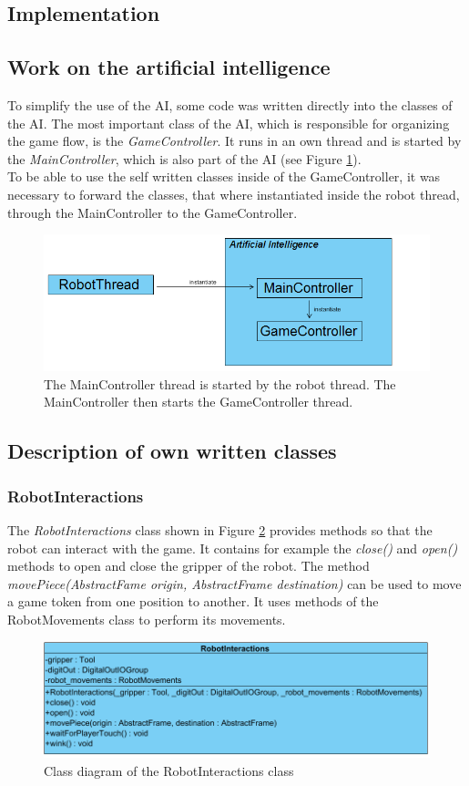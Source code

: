 \documentclass[a4paper]{spie}  %
\begin{document}
\begin{large}
\section{Implementation}
\subsection{Work on the artificial intelligence}
To simplify the use of the AI, some code was written directly into the classes of the AI. The most important class of the AI, which is responsible for organizing the game flow, is the \emph{GameController}. It runs in an own thread and is started by the \emph{MainController}, which is also part of the AI (see Figure \ref{thread_diagram}).\\
To be able to use the self written classes inside of the GameController, it was necessary to forward the classes, that where instantiated inside the robot thread, through the MainController to the GameController.
\begin{figure}[h]
\includegraphics[width=15cm]{images/diagram.png}
\centering
\caption{The MainController thread is started by the robot thread. The MainController then starts the GameController thread.}
\label{thread_diagram}
\end{figure}
\subsection{Description of own written classes}
\subsubsection{RobotInteractions}
The \emph{RobotInteractions} class shown in Figure \ref{class_roboInt} provides methods so that the robot can interact with the game. It contains for example the \emph{close()} and \emph{open()} methods to open and close the gripper of the robot. The method \emph{movePiece(AbstractFame origin, AbstractFrame destination)} can be used to move a game token from one position to another. It uses methods of the RobotMovements class to perform its movements.
\begin{figure}[h]
\includegraphics[width=15cm]{images/class_roboInt.png}
\centering
\caption{Class diagram of the RobotInteractions class}
\label{class_roboInt}
\end{figure}


\end{large}
\end{document}
